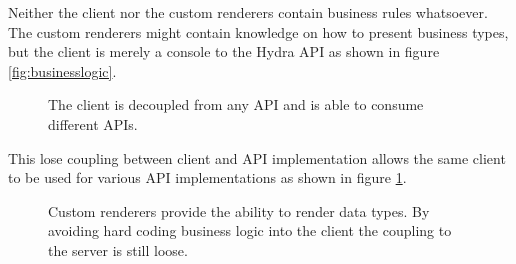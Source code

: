 Neither the client nor the custom renderers contain business rules whatsoever. The custom renderers might contain knowledge on how to present business types, but the client is merely a \gls{console} to the Hydra API as shown in figure \ref{fig:businesslogic}.

\begin{figure}[!htb]
  \caption{The client is decoupled from any API and is able to consume different APIs.}
  \label{fig:losecoupling}
\end{figure}

This lose coupling between client and API implementation allows the same client to be used for various API implementations as shown in figure \ref{fig:losecoupling}.

\begin{figure}[!htb]
  \caption{Custom renderers provide the ability to render data types. By avoiding hard coding business logic into the client the coupling to the server is still loose.}
  \label{fig:linkeddata}
\end{figure}

